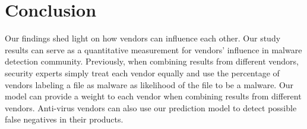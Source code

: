 \vspace{-0.05in}
\section{Conclusion}
Our findings shed light on how vendors can influence each other.
Our study results can serve as a quantitative measurement for vendors' influence in malware detection community. 
Previously, when combining results from different vendors, 
security experts simply treat each vendor equally and use the percentage of 
vendors labeling a file as malware as likelihood of the file to be a malware. 
Our model can provide a weight to each vendor 
when combining results from different vendors.  
Anti-virus vendors can also use our prediction model to detect possible false negatives in their products.
